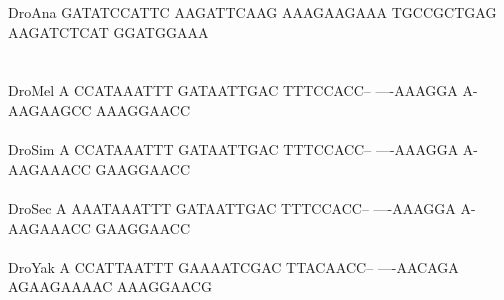 \documentclass[11pt,twoside,reqno,a4paper]{article}
\begin{document}
{DroAna	GATATCCATTC	AAGATTCAAG	AAAGAAGAAA	TGCCGCTGAG	AAGATCTCAT	GGATGGAAA\\
\hspace*{7\charwidth}\hspace*{1\charwidth}\hspace*{1\charwidth}\hspace*{1\charwidth}\hspace*{1\charwidth}\hspace*{1\charwidth}\\
\\
DroMel	A	CCATAAATTT	GATAATTGAC	TTTCCACC--	----AAAGGA	A-AAGAAGCC	AAAGGAACC\\
\hspace*{7\charwidth}\hspace*{1\charwidth}\hspace*{1\charwidth}\hspace*{1\charwidth}\hspace*{1\charwidth}\hspace*{1\charwidth}\hspace*{1\charwidth}\\
DroSim	A	CCATAAATTT	GATAATTGAC	TTTCCACC--	----AAAGGA	A-AAGAAACC	GAAGGAACC\\
\hspace*{7\charwidth}\hspace*{1\charwidth}\hspace*{1\charwidth}\hspace*{1\charwidth}\hspace*{1\charwidth}\hspace*{1\charwidth}\hspace*{1\charwidth}\\
DroSec	A	AAATAAATTT	GATAATTGAC	TTTCCACC--	----AAAGGA	A-AAGAAACC	GAAGGAACC\\
\hspace*{7\charwidth}\hspace*{1\charwidth}\hspace*{1\charwidth}\hspace*{1\charwidth}\hspace*{1\charwidth}\hspace*{1\charwidth}\hspace*{1\charwidth}\\
DroYak	A	CCATTAATTT	GAAAATCGAC	TTACAACC--	----AACAGA	AGAAGAAAAC	AAAGGAACG\\
\hspace*{7\charwidth}\hspace*{1\charwidth}\hspace*{1\charwidth}\hspace*{1\charwidth}\hspace*{1\charwidth}\hspace*{1\charwidth}\hspace*{1\charwidth}\\
}
\end{document}
